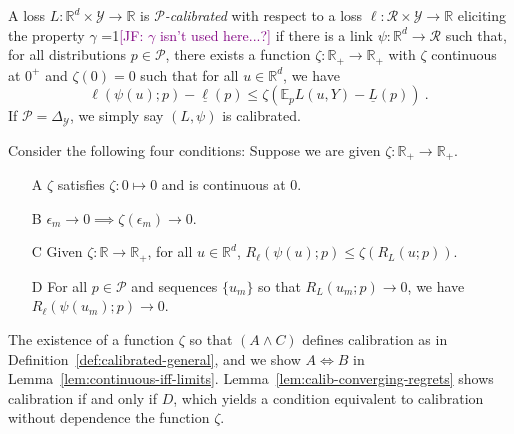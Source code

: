 \documentclass[anon,12pt]{colt2021} %
\newcommand{\Comments}{1}
\newcommand{\mynote}[2]{\ifnum\Comments=1\textcolor{#1}{#2}\fi}
\newcommand{\jessie}[1]{\mynote{purple}{[JF: #1]}}
\newcommand{\reals}{\mathbb{R}}
\newcommand{\simplex}{\Delta_\Y}
\newcommand{\E}{\mathbb{E}}
\newcommand{\R}{\mathcal{R}}
\renewcommand{\P}{\mathcal{P}}
\newcommand{\Y}{\mathcal{Y}}
\newcommand{\exploss}[3]{\E_{#3} #1(#2,Y)}
\newcommand{\risk}[1]{\underline{#1}}
\begin{document}
\begin{definition}[Calibrated]\label{def:calibrated-general}
	A loss $L:\reals^d \times \Y \to \reals$ is \emph{$\P$-calibrated} with respect to a loss $\ell : \R \times \Y \to \reals$ eliciting the property $\gamma$ \jessie{$\gamma$ isn't used here...?} if there is a link $\psi : \reals^d \to \R$ such that, for all distributions $p \in \P$, there exists a function $\zeta : \reals_+ \to \reals_+$ with $\zeta$ continuous at $0^+$ and $\zeta(0) = 0$ such that for all $u \in \reals^d$, we have
	\begin{equation}\label{eq:calibrated-general}
	\ell( \psi(u); p) - \risk{\ell}(p)  \leq \zeta \left(  \exploss{L}{u}{p} - \risk{L}(p) \right)~.~
	\end{equation}
	If $\P = \simplex$, we simply say $(L, \psi)$ is calibrated.
\end{definition}

Consider the following four conditions: Suppose we are given $\zeta:\reals_+ \to \reals_+$.
\begin{enumerate}
	\item [A] $\zeta$ satisfies $\zeta : 0 \mapsto 0$ and is continuous at $0$.
	\item [B] $\epsilon_m \to 0 \implies \zeta(\epsilon_m) \to 0$.
	\item [C] Given $\zeta:\reals \to \reals_+$, for all $u \in \reals^d$, $R_\ell(\psi(u); p) \leq \zeta(R_L(u;p))$.
	\item [D] For all $p \in \P$ and sequences $\{u_m\}$ so that $R_L(u_m; p) \to 0$, we have $R_\ell(\psi(u_m); p) \to 0$.
\end{enumerate}
The existence of a function $\zeta$ so that $(A \wedge C)$ defines calibration as in Definition~\ref{def:calibrated-general}, and we show $A \iff B$ in Lemma~\ref{lem:continuous-iff-limits}.  
Lemma~\ref{lem:calib-converging-regrets} shows calibration if and only if $D$, which yields a condition equivalent to calibration without dependence the function $\zeta$.
\end{document}
